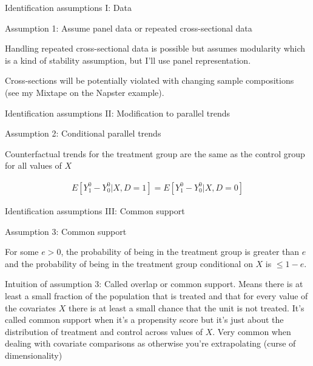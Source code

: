 \documentclass{beamer}
\begin{document}
\begin{frame}{Identification assumptions I: Data}

Assumption 1: Assume panel data or repeated cross-sectional data

\bigskip

Handling repeated cross-sectional data is possible but assumes modularity which is a kind of stability assumption, but I'll use panel representation. 

\bigskip

Cross-sections will be potentially violated with changing sample compositions (see my Mixtape on the Napster example). 

\end{frame}

\begin{frame}{Identification assumptions II: Modification to parallel trends}

Assumption 2: Conditional parallel trends

\bigskip

Counterfactual trends for the treatment group are the same as the control group for all values of $X$

\begin{eqnarray*}
E[Y_1^0 - Y_0^0 | X, D=1] = E[Y^0_1 - Y^0_0 | X, D=0]
\end{eqnarray*}

\end{frame}

\begin{frame}{Identification assumptions III: Common support}

Assumption 3: Common support

\bigskip

For some $e>0$, the probability of being in the treatment group is greater than $e$ and the probability of being in the treatment group conditional on $X$ is $\leq1-e$. 

\bigskip

Intuition of assumption 3: Called overlap or common support. Means there is at least a small fraction of the population that is treated and that for every value of the covariates $X$ there is at least a small chance that the unit is not treated. It's called common support when it's a propensity score but it's just about the distribution of treatment and control across values of $X$. Very common when dealing with covariate comparisons as otherwise you're extrapolating (curse of dimensionality)

\end{frame}
\end{document}
